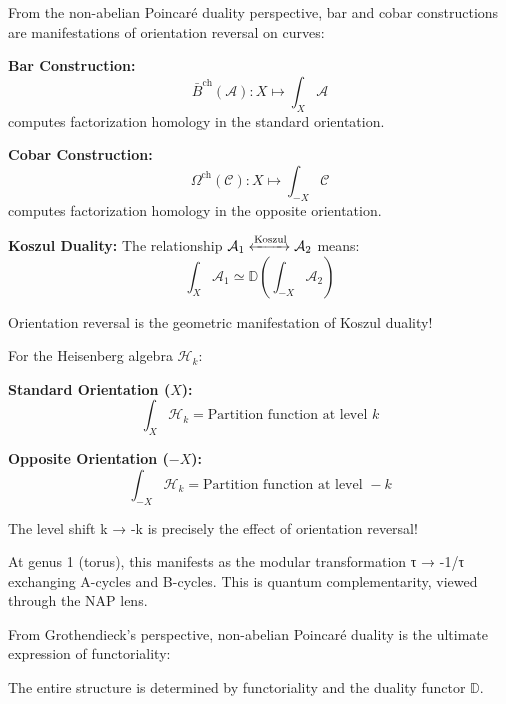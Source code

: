 \begin{remark}\label{rem:NAP-bar-cobar}
From the non-abelian Poincaré duality perspective, bar and cobar constructions are manifestations of orientation reversal on curves:

\textbf{Bar Construction:}
$$\bar{B}^{\text{ch}}(\mathcal{A}): X \mapsto \int_X \mathcal{A}$$
computes factorization homology in the standard orientation.

\textbf{Cobar Construction:}
$$\Omega^{\text{ch}}(\mathcal{C}): X \mapsto \int_{-X} \mathcal{C}$$
computes factorization homology in the opposite orientation.

\textbf{Koszul Duality:}
The relationship $\mathcal{A}_1 \xleftrightarrow{\text{Koszul}} \mathcal{A}_2$ means:
$$\int_X \mathcal{A}_1 \simeq \mathbb{D}\left(\int_{-X} \mathcal{A}_2\right)$$

Orientation reversal is the geometric manifestation of Koszul duality!
\end{remark}

\begin{example}\label{ex:heisenberg-NAP}
For the Heisenberg algebra $\mathcal{H}_k$:

\textbf{Standard Orientation ($X$):}
$$\int_X \mathcal{H}_k = \text{Partition function at level } k$$

\textbf{Opposite Orientation ($-X$):}
$$\int_{-X} \mathcal{H}_k = \text{Partition function at level } -k$$

The level shift k → -k is precisely the effect of orientation reversal!

At genus 1 (torus), this manifests as the modular transformation τ → -1/τ exchanging A-cycles and B-cycles. This is quantum complementarity, viewed through the NAP lens.
\end{example}

\begin{insight}\label{insight:grothendieck-NAP}
From Grothendieck's perspective, non-abelian Poincaré duality is the ultimate expression of functoriality:

\begin{center}
\end{center}

The entire structure is determined by functoriality and the duality functor $\mathbb{D}$.
\end{insight}

